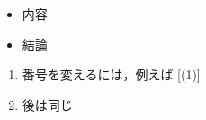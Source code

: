 \documentclass[landscape,10pt]{ujarticle}
\begin{document}
\def\mainslidetitley{22}
\def\ketcletter{slidecolora}
\def\ketcbox{slidecolorb}
\def\ketdbox{slidecolorc}
\def\ketcframe{slidecolord}
\def\ketcshadow{slidecolore}
\def\ketdshadow{slidecolorf}
\def\slidetitlex{6}
\def\slidetitlesize{1.3}
\def\mketcletter{slidecolori}
\def\mketcbox{yellow}
\def\mketdbox{yellow}
\def\mketcframe{yellow}
\def\mslidetitlex{62}
\def\mslidetitlesize{2}

\color{black}
\Large\bf\boldmath
\thispagestyle{empty}
\addtocounter{page}{-1}







\vspace*{18mm}

\begin{itemize}
\item
内容
\item
結論
\end{itemize}



\vspace*{18mm}

\begin{enumerate}[(1)]
\item
番号を変えるには，例えば [(1)]
\item
後は同じ
\end{enumerate}
\end{document}
